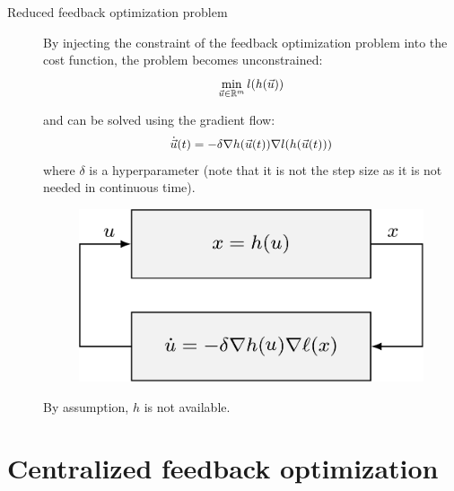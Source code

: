 \begin{description}
    \item[Reduced feedback optimization problem] 
        By injecting the constraint of the feedback optimization problem into the cost function, the problem becomes unconstrained:
        \[
            \min_{{\vec{u}} \in \mathbb{R}^m} l(h({\vec{u}}))
        \]

        and can be solved using the gradient flow:
        \[
            \dot{{\vec{u}}}(t) = -\delta \nabla h({\vec{u}}(t)) \nabla l(h({\vec{u}}(t)))
        \]
        where $\delta$ is a hyperparameter (note that it is not the step size as it is not needed in continuous time).

        \begin{figure}[H]
            \centering
            \includegraphics[width=0.35\linewidth]{./img/feedback_reduced_naive.png}
        \end{figure}

        \begin{remark}
            By assumption, $h$ is not available.
        \end{remark}
\end{description}



\section{Centralized feedback optimization}

